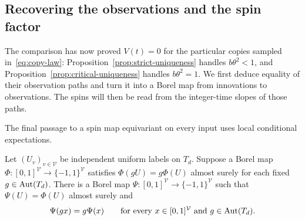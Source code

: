 \subsection{Recovering the observations and the spin factor}
\label{sec:recovery}

The comparison has now proved $V(t)=0$ for the particular copies
sampled in~\eqref{eq:copy-law}: Proposition~\ref{prop:strict-uniqueness}
handles $b\theta^2<1$, and Proposition~\ref{prop:critical-uniqueness}
handles $b\theta^2=1$. We first deduce equality of their observation
paths and turn it into a Borel map from innovations to observations.
The spins will then be read from the integer-time slopes of those paths.

The final passage to a spin map equivariant on every input uses local
conditional expectations.

\begin{lemma}
\label{lem:pointwise-spin-factor}
Let $(U_v)_{v\in\mathcal V}$ be independent uniform labels on $T_d$.
Suppose a Borel map
$\Phi:[0,1]^{\mathcal V}\to\{-1,1\}^{\mathcal V}$ satisfies
$\Phi(gU)=g\Phi(U)$ almost surely for each fixed
$g\in\operatorname{Aut}(T_d)$. There is a Borel map
$\Psi:[0,1]^{\mathcal V}\to\{-1,1\}^{\mathcal V}$ such that
$\Psi(U)=\Phi(U)$ almost surely and
\[
 \Psi(gx)=g\Psi(x)
 \qquad\text{for every }x\in[0,1]^{\mathcal V}
                 \text{ and }g\in\operatorname{Aut}(T_d).
\]
\end{lemma}

